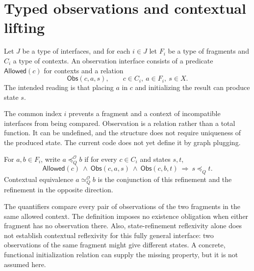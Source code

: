 \section{Typed observations and contextual lifting}

\begin{definition}\label{term:observations}
Let $J$ be a type of interfaces, and for each $i\in J$ let $F_i$ be a
type of fragments and $C_i$ a type of contexts. An observation interface
consists of a predicate $\mathsf{Allowed}(c)$ for contexts and a relation
\[
 \mathsf{Obs}(c,a,s),\qquad c\in C_i,\ a\in F_i,\ s\in X.
\]
The intended reading is that placing $a$ in $c$ and initializing the
result can produce state $s$.
\end{definition}
The common index $i$ prevents a fragment and a context of incompatible
interfaces from being compared. Observation is a relation rather than a
total function. It can be undefined, and the structure does not require
uniqueness of the produced state. The current code does not yet define it
by graph plugging.

\begin{definition}\label{term:contextual}
For $a,b\in F_i$, write $a\preceq_Q^{\mathcal O} b$ if for every
$c\in C_i$ and states $s,t$,
\[
 \mathsf{Allowed}(c)\ \land\ \mathsf{Obs}(c,a,s)\ \land\ \mathsf{Obs}(c,b,t)
 \ \Longrightarrow\ s\preceq_Q t.
\]
Contextual equivalence $a\simeq_Q^{\mathcal O}b$ is the conjunction of
this refinement and the refinement in the opposite direction.
\end{definition}
The quantifiers compare every pair of observations of the two fragments
in the same allowed context. The definition imposes no existence obligation
when either fragment has no observation there. Also, state-refinement
reflexivity alone does not establish contextual reflexivity for this fully
general interface: two observations of the same fragment might give
different states. A concrete, functional initialization relation can supply
the missing property, but it is not assumed here.

